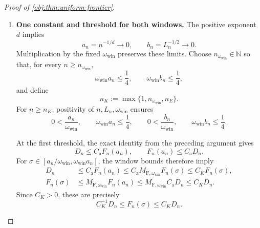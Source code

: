 \documentclass[11pt]{article}
\begin{document}
\begin{proof}[Proof of \cref{obj:thm:uniform-frontier}]
\begin{enumerate}
Now let \(n\ge1\), \(\varrho>0\), and
\(\sigma\in[\varrho/\omega_{\mathrm{win}},\omega_{\mathrm{win}}\varrho]\). Both
\(\sigma\le \omega_{\mathrm{win}}\varrho\) and \(\varrho\le \omega_{\mathrm{win}}\sigma\) hold.
Applying the square-root comparison in both directions with
\(\gamma=d\) and \(\omega_{\log}=n\) gives
\[
\begin{aligned}
F_n(\sigma)
&=
\frac{\sigma}{\varrho}
\frac{\sqrt{\log(e+n\varrho^d)}}
     {\sqrt{\log(e+n\sigma^d)}}F_n(\varrho)
\le M_{\mathrm F,\omega_{\mathrm{win}}}F_n(\varrho),\\
F_n(\varrho)
&=
\frac{\varrho}{\sigma}
\frac{\sqrt{\log(e+n\sigma^d)}}
     {\sqrt{\log(e+n\varrho^d)}}F_n(\sigma)
\le M_{\mathrm F,\omega_{\mathrm{win}}}F_n(\sigma).
\end{aligned}
\]
Applying the logarithmic comparison in both directions with
\(\gamma=2\) and \(\omega_{\log}=L_n>0\), and dividing by \(L_n\), gives
\[
P_n(\sigma)\le M_{\mathrm P,\omega_{\mathrm{win}}}P_n(\varrho),
\qquad
P_n(\varrho)\le M_{\mathrm P,\omega_{\mathrm{win}}}P_n(\sigma).
\]
Thus both scales vary by the stated fixed factors throughout any such radius window.

\item \textbf{One constant and threshold for both windows.}
The positive exponent \(d\) implies
\[
a_n=n^{-1/d}\longrightarrow0,
\qquad
b_n=L_n^{-1/2}\longrightarrow0.
\]
Multiplication by the fixed \(\omega_{\mathrm{win}}\) preserves these limits. Choose
\(n_{\omega_{\mathrm{win}}}\in\mathbb N\) so that, for every \(n\ge n_{\omega_{\mathrm{win}}}\),
\[
\omega_{\mathrm{win}}a_n\le\frac14,\qquad \omega_{\mathrm{win}}b_n\le\frac14,
\]
and define
\[
n_K:=\max\{1,n_{\omega_{\mathrm{win}}},n_E\}.
\]
For \(n\ge n_K\), positivity of \(n,L_n,\omega_{\mathrm{win}}\) ensures
\[
0<\frac{a_n}{\omega_{\mathrm{win}}},\qquad
\omega_{\mathrm{win}}a_n\le\frac14,\qquad
0<\frac{b_n}{\omega_{\mathrm{win}}},\qquad
\omega_{\mathrm{win}}b_n\le\frac14.
\]

At the first threshold, the exact identity from the preceding argument gives
\[
D_n\le C_{\mathrm a}F_n(a_n),
\qquad
F_n(a_n)\le C_{\mathrm a}D_n.
\]
For \(\sigma\in[a_n/\omega_{\mathrm{win}},\omega_{\mathrm{win}}a_n]\), the window bounds therefore imply
\[
\begin{aligned}
D_n
&\le C_{\mathrm a}F_n(a_n)
\le C_{\mathrm a}M_{\mathrm F,\omega_{\mathrm{win}}}F_n(\sigma)
\le C_KF_n(\sigma),\\
F_n(\sigma)
&\le M_{\mathrm F,\omega_{\mathrm{win}}}F_n(a_n)
\le M_{\mathrm F,\omega_{\mathrm{win}}}C_{\mathrm a}D_n
\le C_KD_n.
\end{aligned}
\]
Since \(C_K>0\), these are precisely
\[
C_K^{-1}D_n\le F_n(\sigma)\le C_KD_n.
\]


\end{enumerate}
\end{proof}
\end{document}
